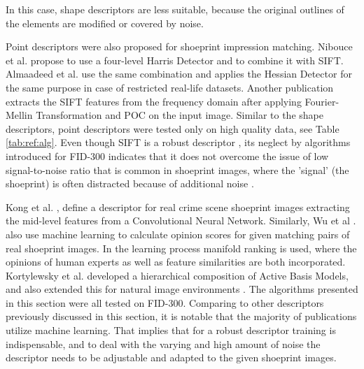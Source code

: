 \documentclass[draft,final]{vutinfth} %
\begin{document}
In this case, shape descriptors are less suitable, because the original outlines of the elements are modified or covered by noise.
\par
Point descriptors were also proposed for shoeprint impression matching.
Nibouce et al. \cite{nibouche2009rotation} propose to use a four-level Harris Detector and to combine it with SIFT.
Almaadeed et al. \cite{almaadeed2015partial} use the same combination and applies the Hessian Detector for the same purpose in case of restricted real-life datasets.
Another publication \cite{richetelli2017classification} extracts the SIFT features from the frequency domain after applying Fourier-Mellin Transformation and POC on the input image.
Similar to the shape descriptors, point descriptors were tested only on high quality data, see Table \ref{tab:ref:alg}.
Even though SIFT is a robust descriptor  \cite{lowe1999object}, its neglect by algorithms introduced for FID-300 indicates that it does not overcome the issue of low signal-to-noise ratio that is common in shoeprint images, where the 'signal' (the shoeprint) is often distracted because of additional noise \cite{kortylewski2014unsupervised}. 
\par
Kong et al. \cite{kong2017cross}, \cite{kong2019cross} define a descriptor for real crime scene shoeprint images extracting the mid-level features from a Convolutional Neural Network.
Similarly, Wu et al .\cite{wu2019losgsr} also use machine learning to calculate opinion scores for given matching pairs of real shoeprint images.
In the learning process manifold ranking is used, where the opinions of human experts as well as feature similarities are both incorporated.
Kortylewsky et al. \cite{kortylewski2016probabilistic} developed a hierarchical composition of Active Basis Models, and also extended this for natural image environments \cite{kortylewski2019greedy}.
The algorithms presented in this section were all tested on FID-300.
Comparing to other descriptors previously discussed in this section, it is notable that the majority of publications utilize machine learning.
That implies that for a robust descriptor training is indispensable, and to deal with the varying and high amount of noise the descriptor needs to be adjustable and adapted to the given shoeprint images. 
\end{document}
